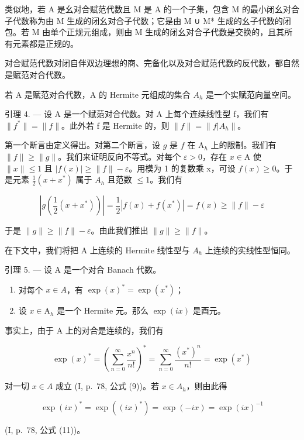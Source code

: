 类似地，若 A 是幺对合赋范代数且 M 是 A 的一个子集，包含 M 的最小闭幺对合子代数称为由 M 生成的闭幺对合子代数；它是由 M ∪ M* 生成的幺子代数的闭包。若 M 由单个正规元组成，则由 M 生成的闭幺对合子代数是交换的，且其所有元素都是正规的。

对合赋范代数对闭自伴双边理想的商、完备化以及对合赋范代数的反代数，都自然是赋范对合代数。

若 A 是赋范对合代数，A 的 Hermite 元组成的集合 \(A_{h}\) 是一个实赋范向量空间。

引理 4. --- 设 A 是一个赋范对合代数。对 A 上每个连续线性型 f，我们有 \(\|f^{*}\|=\|f\|\)。此外若 f 是 Hermite 的，则 \(\|f\|=\|f|A_{h}\|\)。

第一个断言由定义得出。对第二个断言，设 \(g\) 是 \(f\) 在 \(\mathrm{A}_h\) 上的限制。我们有 \(\| f \| \geqslant \| g \|\)。我们来证明反向不等式。对每个 \(\varepsilon > 0\)，存在 \(x \in \mathrm{A}\) 使 \(\| x \| \leqslant 1\) 且 \(|f(x)| \geqslant \|f\| - \varepsilon\)。用模为 1 的复数乘 x，可设 \(f(x) \geqslant 0\)。于是元素 \(\frac{1}{2}(x + x^{*})\) 属于 \(A_{h}\) 且范数 \(\leqslant 1\)。我们有

\[
\left| g \left(\frac {1}{2} (x + x ^ {*})\right) \right| = \frac {1}{2} | f (x) + f (x ^ {*}) | = f (x) \geqslant \| f \| - \varepsilon
\]

于是 \(\|g\|\geqslant\|f\|-\varepsilon\)。由此我们推出 \(\|g\|\geqslant\|f\|\)。

在下文中，我们将把 A 上连续的 Hermite 线性型与 \(A_{h}\) 上连续的实线性型恒同。

引理 5. --- 设 A 是一个对合 Banach 代数。

\begin{enumerate}
\def\labelenumi{\alph{enumi})}
\item
  对每个 \(x \in A\)，有 \(\exp(x)^{*} = \exp(x^{*})\)；
\item
  设 \(x \in \mathrm{A}_h\) 是一个 Hermite 元。那么 \(\exp(ix)\) 是酉元。
\end{enumerate}

事实上，由于 A 上的对合是连续的，我们有

\[
\exp (x) ^ {*} = \left(\sum_ {n = 0} ^ {\infty} \frac {x ^ {n}}{n !}\right) ^ {*} = \sum_ {n = 0} ^ {\infty} \frac {(x ^ {*}) ^ {n}}{n !} = \exp (x ^ {*})
\]

对一切 \(x \in A\) 成立 (I, p.~78, 公式 (9))。若 \(x \in A_{h}\)，则由此得

\[
\exp (i x) ^ {*} = \exp ((i x) ^ {*}) = \exp (- i x) = \exp (i x) ^ {- 1}
\]

(I, p.~78, 公式 (11))。

